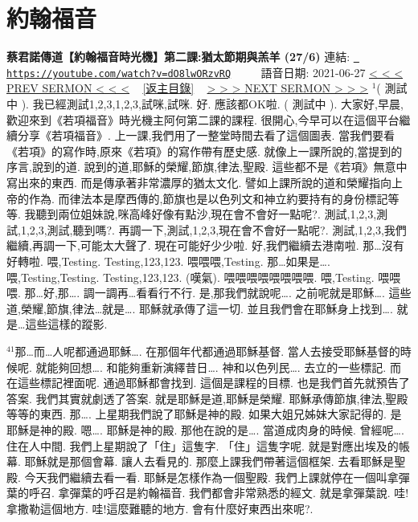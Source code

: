 \documentclass{book}
\begin{document}
\section{約翰福音}
\label{sec:dO8lwORzvRQ}
\textbf{蔡君諾傳道【約翰福音時光機】第二課:猶太節期與羔羊 (27/6)}
\newline
\newline
連結: \href{https://youtube.com/watch?v=dO8lwORzvRQ}{\texttt{ https://youtube.com/watch?v=dO8lwORzvRQ}} ~~~~ 語音日期: 2021-06-27 
\newline
\newline
\hyperref[sec:V9Yc8B3k4jI]{\small{< < < PREV SERMON < < <}}
~
\hyperref[sec:index]{\small{[返主目錄]}}
~
\hyperref[sec:k_cCh3J_U2w]{\small{> > > NEXT SERMON > > >}}
\newline
\newline
$^{1}$( 測試中 ).
我已經測試1,2,3,1,2,3,試咪,試咪.
好.
應該都OK啦.
( 測試中 ).
大家好,早晨,歡迎來到《若項福音》時光機主阿何第二課的課程.
很開心,今早可以在這個平台繼續分享《若項福音》.
上一課,我們用了一整堂時間去看了這個圖表.
當我們要看《若項》的寫作時,原來《若項》的寫作帶有歷史感.
就像上一課所說的,當提到的序言,說到的道.
說到的道,耶穌的榮耀,節旗,律法,聖殿.
這些都不是《若項》無意中寫出來的東西.
而是傳承著非常濃厚的猶太文化.
譬如上課所說的道和榮耀指向上帝的作為.
而律法本是摩西傳的,節旗也是以色列文和神立約要持有的身份標記等等.
我聽到兩位姐妹說,咪高峰好像有點沙,現在會不會好一點呢?.
測試,1,2,3,測試,1,2,3,測試,聽到嗎?.
再調一下,測試,1,2,3,現在會不會好一點呢?.
測試,1,2,3,我們繼續,再調一下,可能太大聲了.
現在可能好少少啦.
好,我們繼續去港南啦.
那…沒有好轉啦.
喂,Testing.
Testing,123,123.
喂喂喂,Testing.
那…如果是….
喂,Testing,Testing.
Testing,123,123.
(嘆氣).
喂喂喂喂喂喂喂喂.
喂,Testing.
喂喂喂.
那…好,那….
調一調再…看看行不行.
是,那我們就說呢….
之前呢就是耶穌….
這些道,榮耀,節旗,律法…就是….
耶穌就承傳了這一切.
並且我們會在耶穌身上找到….
就是…這些這樣的蹤影.

$^{41}$那…而…人呢都通過耶穌….
在那個年代都通過耶穌基督.
當人去接受耶穌基督的時候呢.
就能夠回想….
和能夠重新演繹昔日….
神和以色列民….
去立的一些標記.
而在這些標記裡面呢.
通過耶穌都會找到.
這個是課程的目標.
也是我們首先就預告了答案.
我們其實就劇透了答案.
就是耶穌是道,耶穌是榮耀.
耶穌承傳節旗,律法,聖殿等等的東西.
那….
上星期我們說了耶穌是神的殿.
如果大姐兄姊妹大家記得的.
是耶穌是神的殿.
嗯….
耶穌是神的殿.
那他在說的是….
當道成肉身的時候.
曾經呢….
住在人中間.
我們上星期說了「住」這隻字.
「住」這隻字呢.
就是對應出埃及的帳幕.
耶穌就是那個會幕.
讓人去看見的.
那麼上課我們帶著這個框架.
去看耶穌是聖殿.
今天我們繼續去看一看.
耶穌是怎樣作為一個聖殿.
我們上課就停在一個叫拿彈葉的呼召.
拿彈葉的呼召是約翰福音.
我們都會非常熟悉的經文.
就是拿彈葉說.
哇!拿撒勒這個地方.
哇!這麼難聽的地方.
會有什麼好東西出來呢?.
\end{document}
